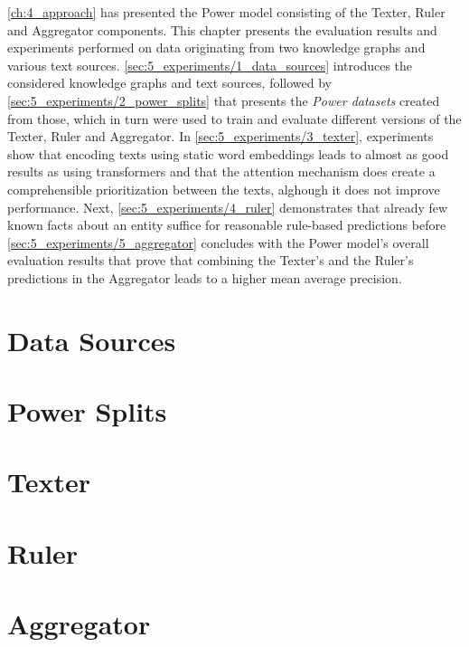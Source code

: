 \autoref{ch:4_approach} has presented the Power model consisting of the Texter, Ruler and Aggregator components. This chapter presents the evaluation results and experiments performed on data originating from two knowledge graphs and various text sources. \autoref{sec:5_experiments/1_data_sources} introduces the considered knowledge graphs and text sources, followed by \autoref{sec:5_experiments/2_power_splits} that presents the \emph{Power datasets} created from those, which in turn were used to train and evaluate different versions of the Texter, Ruler and Aggregator. In \autoref{sec:5_experiments/3_texter}, experiments show that encoding texts using static word embeddings leads to almost as good results as using transformers and that the attention mechanism does create a comprehensible prioritization between the texts, alghough it does not improve performance. Next, \autoref{sec:5_experiments/4_ruler} demonstrates that already few known facts about an entity suffice for reasonable rule-based predictions before \autoref{sec:5_experiments/5_aggregator} concludes with the Power model's overall evaluation results that prove that combining the Texter's and the Ruler's predictions in the Aggregator leads to a higher mean average precision.


\section{Data Sources}
\label{sec:5_experiments/1_data_sources}



\section{Power Splits}
\label{sec:5_experiments/2_power_splits}



\section{Texter}
\label{sec:5_experiments/3_texter}



\section{Ruler}
\label{sec:5_experiments/4_ruler}



\section{Aggregator}
\label{sec:5_experiments/5_aggregator}

